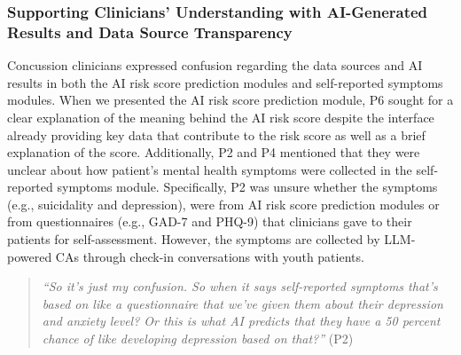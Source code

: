 \subsubsection{Supporting Clinicians' Understanding with AI-Generated Results and Data Source Transparency}
\label{subsubsec:explanation}
Concussion clinicians expressed confusion regarding the data sources and AI results in both the AI risk score prediction modules and self-reported symptoms modules. 
When we presented the AI risk score prediction module, P6 sought for a clear explanation of the meaning behind the AI risk score despite the interface already providing key data that contribute to the risk score as well as a brief explanation of the score. 
Additionally, P2 and P4 mentioned that they were unclear about how patient's mental health symptoms were collected in the self-reported symptoms module.
Specifically, P2 was unsure whether the symptoms (e.g., suicidality and depression), were from AI risk score prediction modules or from questionnaires (e.g., GAD-7 and PHQ-9) that clinicians gave to their patients for self-assessment. However, the symptoms are collected by LLM-powered CAs through check-in conversations with youth patients.
\begin{quote}
    \textit{``So it's just my confusion. So when it says self-reported symptoms that's based on like a questionnaire that we've given them about their depression and anxiety level? Or this is what AI predicts that they have a 50 percent chance of like developing depression based on that?''} (P2)
\end{quote}



